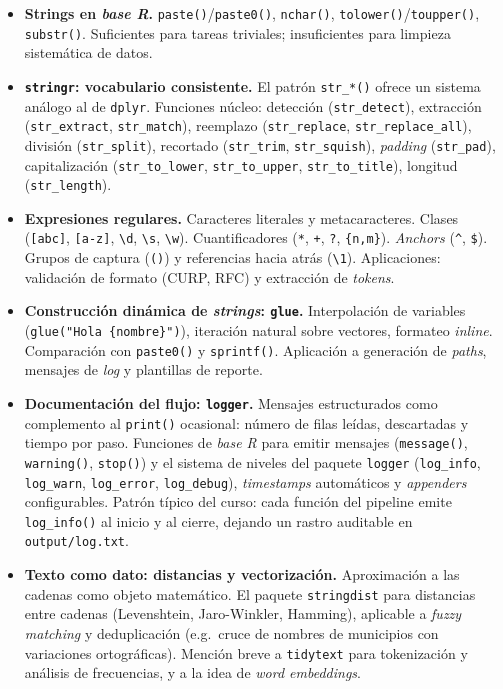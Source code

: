\documentclass[11pt,letterpaper]{article}
\begin{document}
\begin{itemize}[leftmargin=*, itemsep=2pt]
    \item \textbf{Strings en \textit{base R}.} \texttt{paste()}/\texttt{paste0()}, \texttt{nchar()}, \texttt{tolower()}/\texttt{toupper()}, \texttt{substr()}. Suficientes para tareas triviales; insuficientes para limpieza sistemática de datos.
    \item \textbf{\texttt{stringr}: vocabulario consistente.} El patrón \texttt{str\_*()} ofrece un sistema análogo al de \texttt{dplyr}. Funciones núcleo: detección (\texttt{str\_detect}), extracción (\texttt{str\_extract}, \texttt{str\_match}), reemplazo (\texttt{str\_replace}, \texttt{str\_replace\_all}), división (\texttt{str\_split}), recortado (\texttt{str\_trim}, \texttt{str\_squish}), \textit{padding} (\texttt{str\_pad}), capitalización (\texttt{str\_to\_lower}, \texttt{str\_to\_upper}, \texttt{str\_to\_title}), longitud (\texttt{str\_length}).
    \item \textbf{Expresiones regulares.} Caracteres literales y metacaracteres. Clases (\texttt{[abc]}, \texttt{[a-z]}, \texttt{\textbackslash d}, \texttt{\textbackslash s}, \texttt{\textbackslash w}). Cuantificadores (\texttt{*}, \texttt{+}, \texttt{?}, \texttt{\{n,m\}}). \textit{Anchors} (\texttt{\textasciicircum}, \texttt{\$}). Grupos de captura (\texttt{()}) y referencias hacia atrás (\texttt{\textbackslash 1}). Aplicaciones: validación de formato (CURP, RFC) y extracción de \textit{tokens}.
    \item \textbf{Construcción dinámica de \textit{strings}: \texttt{glue}.} Interpolación de variables (\texttt{glue("Hola \{nombre\}")}), iteración natural sobre vectores, formateo \textit{inline}. Comparación con \texttt{paste0()} y \texttt{sprintf()}. Aplicación a generación de \textit{paths}, mensajes de \textit{log} y plantillas de reporte.
    \item \textbf{Documentación del flujo: \texttt{logger}.} Mensajes estructurados como complemento al \texttt{print()} ocasional: número de filas leídas, descartadas y tiempo por paso. Funciones de \textit{base R} para emitir mensajes (\texttt{message()}, \texttt{warning()}, \texttt{stop()}) y el sistema de niveles del paquete \texttt{logger} (\texttt{log\_info}, \texttt{log\_warn}, \texttt{log\_error}, \texttt{log\_debug}), \textit{timestamps} automáticos y \textit{appenders} configurables. Patrón típico del curso: cada función del pipeline emite \texttt{log\_info()} al inicio y al cierre, dejando un rastro auditable en \texttt{output/log.txt}.
    \item \textbf{Texto como dato: distancias y vectorización.} Aproximación a las cadenas como objeto matemático. El paquete \texttt{stringdist} para distancias entre cadenas (Levenshtein, Jaro-Winkler, Hamming), aplicable a \textit{fuzzy matching} y deduplicación (e.g.\ cruce de nombres de municipios con variaciones ortográficas). Mención breve a \texttt{tidytext} para tokenización y análisis de frecuencias, y a la idea de \textit{word embeddings}.
\end{itemize}
\end{document}
